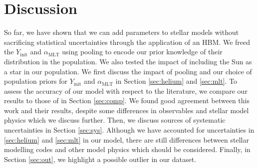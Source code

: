 \documentclass[a4paper,fleqn,usenatbib]{mnras}
\newcommand{\mlt}{\ensuremath{{\alpha_\mathrm{MLT}}}}
\begin{document}



\section{Discussion}\label{sec:dis}


So far, we have shown that we can add parameters to stellar models without sacrificing statistical uncertainties through the application of an HBM. We freed the $Y_\mathrm{init}$ and $\mlt$ using pooling to encode our prior knowledge of their distribution in the population. We also tested the impact of including the Sun as a star in our population. We first discuss the impact of pooling and our choice of population priors for $Y_\mathrm{init}$ and $\mlt$ in Section \ref{sec:helium} and \ref{sec:mlt}. To assess the accuracy of our model with respect to the literature, we compare our results to those of  in Section \ref{sec:comp}. We found good agreement between this work and their results, despite some differences in observables and stellar model physics which we discuss further. Then, we discuss sources of systematic uncertainties in Section \ref{sec:sys}. Although we have accounted for uncertainties in \ref{sec:helium} and \ref{sec:mlt} in our model, there are still differences between stellar modelling codes and other model physics which should be considered. Finally, in Section \ref{sec:out}, we highlight a possible outlier in our dataset.
\end{document}
